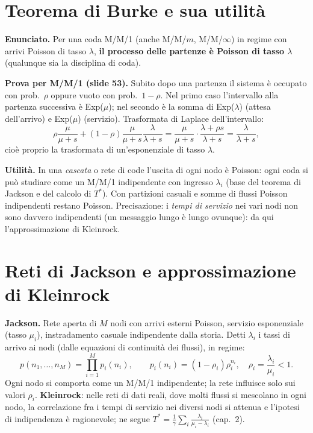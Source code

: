 \section{Teorema di Burke e sua utilità}
\textbf{Enunciato.} Per una coda M/M/1 (anche M/M/$m$, M/M/$\infty$) in regime con arrivi Poisson di tasso $\lambda$, \textbf{il processo delle partenze è Poisson di tasso $\lambda$} (qualunque sia la disciplina di coda).

\textbf{Prova per M/M/1 (slide 53).} Subito dopo una partenza il sistema è occupato con prob.\ $\rho$ oppure vuoto con prob.\ $1-\rho$. Nel primo caso l'intervallo alla partenza successiva è Exp($\mu$); nel secondo è la somma di Exp($\lambda$) (attesa dell'arrivo) e Exp($\mu$) (servizio). Trasformata di Laplace dell'intervallo:
\[
\rho\frac{\mu}{\mu+s}+(1-\rho)\frac{\mu}{\mu+s}\frac{\lambda}{\lambda+s}
=\frac{\mu}{\mu+s}\cdot\frac{\lambda+\rho s}{\lambda+s}
=\frac{\lambda}{\lambda+s},
\]
cioè proprio la trasformata di un'esponenziale di tasso $\lambda$.

\textbf{Utilità.} In una \emph{cascata} o rete di code l'uscita di ogni nodo è Poisson: ogni coda si può studiare come un M/M/1 indipendente con ingresso $\lambda_i$ (base del teorema di Jackson e del calcolo di $T^*$). Con partizioni casuali e somme di flussi Poisson indipendenti restano Poisson. Precisazione: i \emph{tempi di servizio} nei vari nodi non sono davvero indipendenti (un messaggio lungo è lungo ovunque): da qui l'approssimazione di Kleinrock.

\section{Reti di Jackson e approssimazione di Kleinrock}
\textbf{Jackson.} Rete aperta di $M$ nodi con arrivi esterni Poisson, servizio esponenziale (tasso $\mu_i$), instradamento casuale indipendente dalla storia. Detti $\lambda_i$ i tassi di arrivo ai nodi (dalle equazioni di continuità dei flussi), in regime:
\[
p(n_1,\dots,n_M)=\prod_{i=1}^Mp_i(n_i),\qquad p_i(n_i)=(1-\rho_i)\rho_i^{n_i},\quad\rho_i=\frac{\lambda_i}{\mu_i}<1 .
\]
Ogni nodo si comporta come un M/M/1 indipendente; la rete influisce solo sui valori $\rho_i$. \textbf{Kleinrock}: nelle reti di dati reali, dove molti flussi si mescolano in ogni nodo, la correlazione fra i tempi di servizio nei diversi nodi si attenua e l'ipotesi di indipendenza è ragionevole; ne segue $T^*=\frac1\gamma\sum_i\frac{\lambda_i}{\mu_i-\lambda_i}$ (cap.~2).

